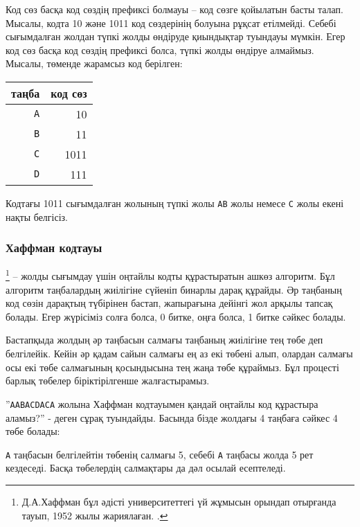 Код сөз басқа код сөздің префиксі 
болмауы -- код сөзге қойылатын басты талап. Мысалы, кодта 10 және
1011 код сөздерінің болуына рұқсат етілмейді.
Себебі сығымдалған жолдан түпкі жолды
өндіруде қиындықтар туындауы мүмкін. 
Егер код сөз басқа код сөздің префиксі болса,
түпкі жолды өндіруе алмаймыз. 
Мысалы, төменде жарамсыз код берілген:
\begin{center}
\begin{tabular}{rr}
таңба & код сөз \\
\hline
\texttt{A} & 10 \\
\texttt{B} & 11 \\
\texttt{C} & 1011 \\
\texttt{D} & 111 \\
\end{tabular}
\end{center}
Кодтағы 1011 сығымдалған жолының түпкі жолы
\texttt{AB} жолы немесе \texttt{C} жолы екені нақты белгісіз.


\subsubsection{Хаффман кодтауы}

\footnote{Д.А.Хаффман бұл әдісті 
университеттегі үй жұмысын орындап отырғанда тауып, 
1952 жылы жариялаған. \cite{huf52}.} 
-- жолды сығымдау үшін оңтайлы кодты құрастыратын
ашкөз алгоритм.  
Бұл алгоритм таңбалардың жиілігіне сүйеніп
бинарлы дарақ құрайды. Әр таңбаның
код сөзін дарақтың түбірінен бастап,
жапырағына дейінгі жол арқылы тапсақ болады.
Егер жүрісіміз солға болса, 0 битке, 
оңға болса, 1 битке сәйкес болады.

Бастапқыда жолдың әр таңбасын салмағы таңбаның
жиілігіне тең төбе деп белгілейік. Кейін әр қадам сайын
салмағы ең аз екі төбені алып, олардан салмағы осы
екі төбе салмағының қосындысына тең жаңа
төбе құраймыз. Бұл процесті барлық төбелер 
біріктірілгенше жалғастырамыз.

''\texttt{AABACDACA} жолына
Хаффман кодтауымен қандай оңтайлы код
құрастыра аламыз?'' - деген сұрақ туындайды. 
Басында бізде жолдағы 4 таңбаға сәйкес
4 төбе болады:

\begin{center}
\end{center}
\texttt{A} таңбасын белгілейтін төбенің салмағы
5, себебі \texttt{A} таңбасы жолда 5 рет кездеседі.
Басқа төбелердің салмақтары да дәл осылай есептеледі.

